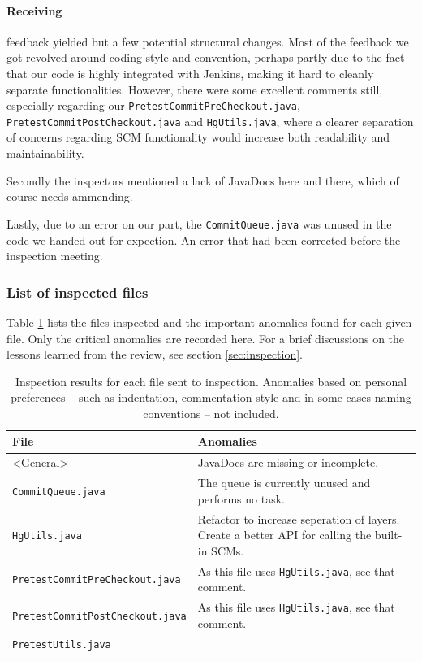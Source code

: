 \documentclass[a4paper,11pt]{article}
\begin{document}
\paragraph{Receiving} feedback yielded but a few potential structural changes. Most
of the feedback we got revolved around coding style and convention, perhaps
partly due to the fact that our code is highly integrated with Jenkins, making
it hard to cleanly separate functionalities. However, there were some excellent
comments still, especially regarding our \texttt{PretestCommitPreCheckout.java},
\texttt{PretestCommitPostCheckout.java} and \texttt{HgUtils.java}, where a
clearer separation of concerns regarding SCM functionality would increase both
readability and maintainability.

Secondly the inspectors mentioned a lack of JavaDocs here and there, which of
course needs ammending.

Lastly, due to an error on our part, the \texttt{CommitQueue.java} was unused in
the code we handed out for expection. An error that had been corrected before
the inspection meeting.

\subsubsection{List of inspected files}
Table \ref{tab:inspection} lists the files inspected and the important anomalies
found for each given file. Only the critical anomalies are recorded here. For a
brief discussions on the lessons learned from the review, see section
\ref{sec:inspection}.

\begin{table}[!ht]
	\centering
	\begin{tabular}{| p{6cm} | p{5cm} |}
			\hline
			\textbf{File}&\textbf{Anomalies} \\
			\hline
			<General> & JavaDocs are missing or incomplete. \\
			\hline
			\texttt{CommitQueue.java} &
				The queue is currently unused and performs no task.\\
			\hline
			\texttt{HgUtils.java} &
				Refactor to increase seperation of layers. Create a better API
				for calling the built-in SCMs.\\
			\hline
			\texttt{PretestCommitPreCheckout.java} &
				As this file uses \texttt{HgUtils.java}, see that comment. \\
			\hline
			\texttt{PretestCommitPostCheckout.java} &
				As this file uses \texttt{HgUtils.java}, see that comment. \\
			\hline
			\texttt{PretestUtils.java} & \\
			\hline
		\end{tabular}
		\caption{Inspection results for each file sent to inspection. Anomalies based
		on personal preferences -- such as indentation, commentation style and in some
		cases naming conventions -- not included.}
		\label{tab:inspection}
\end{table}
\end{document}
